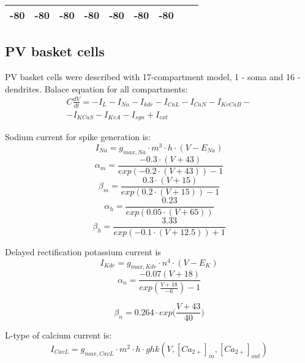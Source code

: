 \documentclass[12pt]{article}
\begin{document}
\begin{table}[h]
\begin{center}
\begin{tabular}{ |p{2cm} | p{1.25cm} |p{1.25cm} |p{1.25cm} |p{1.25cm} |p{1.25cm} |p{1.25cm} |p{1.25cm} |p{1.25cm} | }
-80 & -80 & -80 & -80 & -80 & -80 & -80 \\ \hline  
			
		\end{tabular}
	\end{center}
\end{table}

\subsection{PV basket cells}
PV basket cells were described with 17-compartment model, 1 - soma and 16 - dendrites. Balace equation for all compartments:
\begin{eqnarray}
C\frac{dV}{dt}=-I_L-I_{Na}-I_{kdr}-I_{CaL}-I_{CaN}-I_{KvCaB}- \nonumber \\ 
-I_{KCaS}-I_{KvA} -I_{syn} + I_{ext}
\end{eqnarray}

Sodium current for spike generation is:
\begin{equation}
\label{eq:Nav}
I_{Na} = g_{max, Na} \cdot m^3 \cdot h \cdot (V - E_{Na})
\end{equation}
\begin{equation}
\alpha_m = \frac{-0.3 \cdot (V + 43)}{exp(-0.2\cdot(V+43)) - 1}
\end{equation}
\begin{equation}
\beta_m = \frac{0.3 \cdot (V + 15)}{exp(0.2\cdot(V+15)) - 1}
\end{equation}
\begin{equation}
\alpha_h = \frac{0.23}{exp(0.05\cdot(V+65))}
\end{equation}
\begin{equation}
\beta_h = \frac{3.33}{exp(-0.1\cdot(V+12.5)) + 1}
\end{equation}

Delayed rectification potassium current is
\begin{equation}
\label{eq:Kdrfast}
I_{Kdr} = g_{max, Kdr} \cdot n^4 \cdot (V - E_K)
\end{equation}
\begin{equation}
\alpha_n = \frac{-0.07(V + 18)}{exp(\frac{V + 18}{-6}) - 1}
\end{equation}

\begin{equation}
\beta_n = 0.264 \cdot exp \Big( \frac{V + 43}{40} \Big)
\end{equation}

L-type of calcium current is: 
\begin{equation}
\label{eq:CavL}
I_{CavL} = g_{max, CavL} \cdot m^2 \cdot h \cdot ghk(V, [Ca_{2+}]_{in}, [Ca_{2+}]_{out} )
\end{equation}
\end{document}
